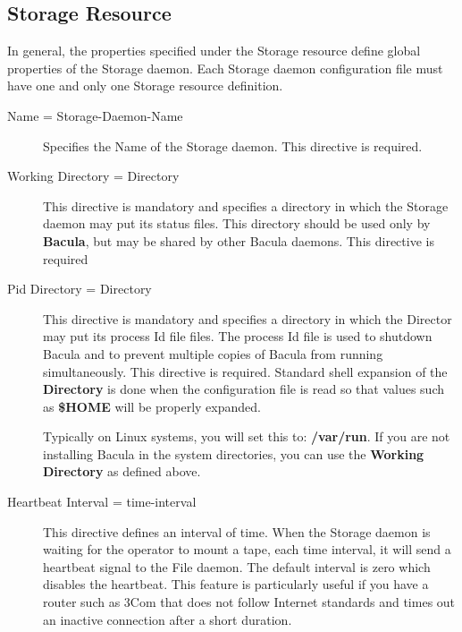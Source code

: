 \subsection*{Storage Resource}
\label{StorageResource}

In general, the properties specified under the Storage resource define global
properties of the Storage daemon. Each Storage daemon configuration file must
have one and only one Storage resource definition. 

\begin{description}

\item [Name = \lt{}Storage-Daemon-Name\gt{}]
   Specifies the Name of the Storage daemon. This  directive is required. 

\item [Working Directory = \lt{}Directory\gt{}]
   This directive  is mandatory and specifies a directory in which the Storage
daemon  may put its status files. This directory should be used only  by {\bf
Bacula}, but may be shared by other Bacula daemons. This  directive is
required  

\item [Pid Directory = \lt{}Directory\gt{}]
   This directive  is mandatory and specifies a directory in which the Director 
may put its process Id file files. The process Id file is used to  shutdown
Bacula and to prevent multiple copies of  Bacula from running simultaneously. 
This directive is required. Standard shell expansion of the {\bf Directory} 
is done when the configuration file is read so that values such  as {\bf
\$HOME} will be properly expanded.  

Typically on Linux systems, you will set this to:  {\bf /var/run}. If you are
not installing Bacula in the  system directories, you can use the {\bf Working
Directory} as  defined above. 

\item [Heartbeat Interval = \lt{}time-interval\gt{}]
   This directive defines an interval of time.  When the Storage daemon is
   waiting for the operator to mount a tape, each time interval, it will
   send a heartbeat signal to the File daemon.  The default interval is
   zero which disables the heartbeat.  This feature is particularly useful
   if you have a router such as 3Com that does not follow Internet
   standards and times out an inactive connection after a short duration.


\end{description}
